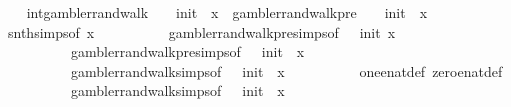 \begin{isabellebody}
%
\isadelimproof
%
\endisadelimproof
%
\isatagproof
{}\isamarkupfalse%
{\isacharminus}{\kern0pt}\isanewline
\ \ \isamarkupfalse%
\ int{}{\isacharcolon}{\kern0pt}{\isachardoublequoteopen}gambler{\isacharunderscore}{\kern0pt}rand{\isacharunderscore}{\kern0pt}walk\ {}\ {\isacharparenleft}{\kern0pt}{\isacharminus}{\kern0pt}\ {}{\isacharparenright}{\kern0pt}\ init\ {}\ x\ {\isacharequal}{\kern0pt}\ {\isacharparenleft}{\kern0pt}gambler{\isacharunderscore}{\kern0pt}rand{\isacharunderscore}{\kern0pt}walk{\isacharunderscore}{\kern0pt}pre\ {}\ {\isacharparenleft}{\kern0pt}{\isacharminus}{\kern0pt}\ {}{\isacharparenright}{\kern0pt}\ init\ {}\ x{\isacharparenright}{\kern0pt}\ {\isacharminus}{\kern0pt}\ {}{\isachardoublequoteclose}\isanewline
\ \ \ \ \isamarkupfalse%
\ snth{\isachardot}{\kern0pt}simps{\isacharparenleft}{\kern0pt}{}{\isacharparenright}{\kern0pt}{\isacharbrackleft}{\kern0pt}of\ x{\isacharbrackright}{\kern0pt}\isanewline
\ \ \ \ \ \ \ \ \ \ gambler{\isacharunderscore}{\kern0pt}rand{\isacharunderscore}{\kern0pt}walk{\isacharunderscore}{\kern0pt}pre{\isachardot}{\kern0pt}simps{\isacharparenleft}{\kern0pt}{}{\isacharparenright}{\kern0pt}{\isacharbrackleft}{\kern0pt}of\ {}\ {\isachardoublequoteopen}{\isacharminus}{\kern0pt}{}{\isachardoublequoteclose}\ init\ x{\isacharbrackright}{\kern0pt}\isanewline
\ \ \ \ \ \ \ \ \ \ gambler{\isacharunderscore}{\kern0pt}rand{\isacharunderscore}{\kern0pt}walk{\isacharunderscore}{\kern0pt}pre{\isachardot}{\kern0pt}simps{\isacharparenleft}{\kern0pt}{}{\isacharparenright}{\kern0pt}{\isacharbrackleft}{\kern0pt}of\ {}\ {\isachardoublequoteopen}{\isacharminus}{\kern0pt}{}{\isachardoublequoteclose}\ init\ {}\ x{\isacharbrackright}{\kern0pt}\isanewline
\ \ \ \ \ \ \ \ \ \ gambler{\isacharunderscore}{\kern0pt}rand{\isacharunderscore}{\kern0pt}walk{\isachardot}{\kern0pt}simps{\isacharbrackleft}{\kern0pt}of\ {}\ {\isachardoublequoteopen}{\isacharminus}{\kern0pt}{}{\isachardoublequoteclose}\ init\ {}\ x{\isacharbrackright}{\kern0pt}\isanewline
\ \ \ \ \ \ \ \ \ \ one{\isacharunderscore}{\kern0pt}enat{\isacharunderscore}{\kern0pt}def\ zero{\isacharunderscore}{\kern0pt}enat{\isacharunderscore}{\kern0pt}def\isanewline
\ \ \ \ \ \ \ \ \ \ gambler{\isacharunderscore}{\kern0pt}rand{\isacharunderscore}{\kern0pt}walk{\isachardot}{\kern0pt}simps{\isacharbrackleft}{\kern0pt}of\ {}\ {\isachardoublequoteopen}{\isacharminus}{\kern0pt}{}{\isachardoublequoteclose}\ init\ {}\ x{\isacharbrackright}{\kern0pt}\isanewline

\end{isabellebody}
